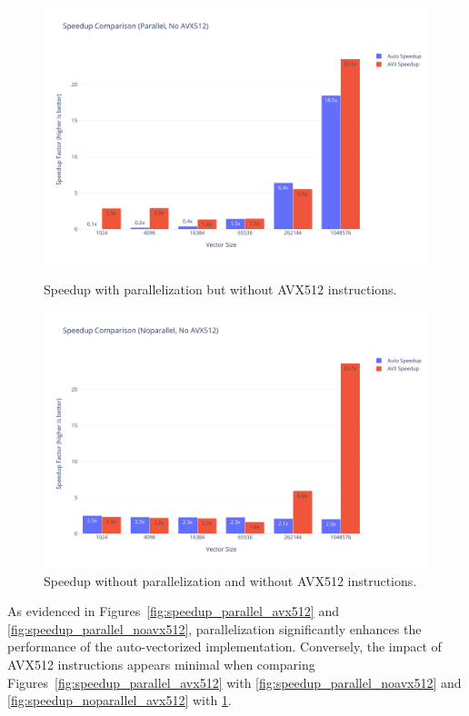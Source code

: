 \documentclass[10pt]{article}
\begin{document}
\begin{figure}[H]
  \centering
  \begin{minipage}{0.48\textwidth}
    \centering
    \includegraphics[width=\textwidth]{../images/speedup/softmax_speedup_parallel_noavx512.pdf}
    \caption{Speedup with parallelization but without AVX512 instructions.}
    \label{fig:speedup_parallel_noavx512}
  \end{minipage}
  \hfill
  \begin{minipage}{0.48\textwidth}
    \centering
    \includegraphics[width=\textwidth]{../images/speedup/softmax_speedup_noparallel_noavx512.pdf}
    \caption{Speedup without parallelization and without AVX512 instructions.}
    \label{fig:speedup_noparallel_noavx512}
  \end{minipage}
\end{figure}

As evidenced in Figures~\ref{fig:speedup_parallel_avx512} and \ref{fig:speedup_parallel_noavx512}, parallelization significantly enhances the performance of the auto-vectorized implementation. Conversely, the impact of AVX512 instructions appears minimal when comparing Figures~\ref{fig:speedup_parallel_avx512} with \ref{fig:speedup_parallel_noavx512} and \ref{fig:speedup_noparallel_avx512} with \ref{fig:speedup_noparallel_noavx512}.
\end{document}
